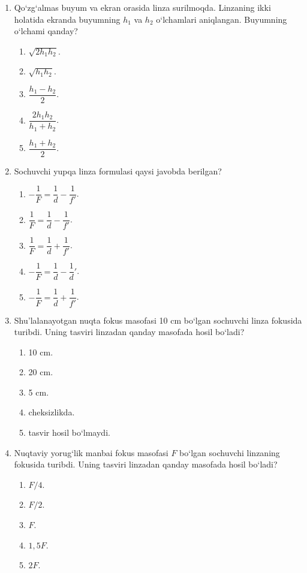 \begin{enumerate}
\item Qo‘zg‘almas buyum va ekran orasida linza surilmoqda. Linzaning ikki holatida ekranda buyumning $h_1$ va $h_2$ o‘lchamlari aniqlangan. Buyumning o‘lchami qanday?
\begin{enumerate}[label=\Alph*)]
\item $\sqrt{2h_1h_2}$.
\item $\sqrt{h_1h_2}$.
\item $\dfrac{h_1-h_2}{2}$.
\item $\dfrac{2h_1h_2}{h_1+h_2}$.
\item $\dfrac{h_1+h_2}{2}$.
\end{enumerate}

\item Sochuvchi yupqa linza formulasi qaysi javobda berilgan?
\begin{enumerate}[label=\Alph*)]
\item $-\dfrac1F=\dfrac1d-\dfrac1{f'}$.
\item $\dfrac1F=\dfrac1d-\dfrac1{f'}$.
\item $\dfrac1F=\dfrac1d+\dfrac1{f'}$.
\item $-\dfrac1F=\dfrac1d-\dfrac1d'$.
\item $-\dfrac1F=\dfrac1d+\dfrac1{f'}$.
\end{enumerate}

\item Shu’lalanayotgan nuqta fokus masofasi 10 cm bo‘lgan sochuvchi linza fokusida turibdi. Uning tasviri linzadan qanday masofada hosil bo‘ladi?
\begin{enumerate}[label=\Alph*)]
\item 10 cm.
\item 20 cm.
\item 5 cm.
\item cheksizlikda.
\item tasvir hosil bo‘lmaydi.
\end{enumerate}

\item Nuqtaviy yorug‘lik manbai fokus masofasi $F$ bo‘lgan sochuvchi linzaning fokusida turibdi. Uning tasviri linzadan qanday masofada hosil bo‘ladi?
\begin{enumerate}[label=\Alph*)]
\item $F/4$.
\item $F/2$.
\item $F$.
\item $1{,}5F$.
\item $2F$.
\end{enumerate}


\end{enumerate}
